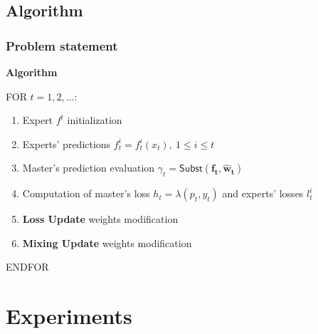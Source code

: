 \documentclass{beamer}
\begin{document}
\subsection{Algorithm} 
\begin{frame}
\frametitle{Problem statement}

\textbf{Algorithm}

\bigskip
%
FOR $t = 1, 2, \dots$:
\begin{enumerate}
\item Expert $f^t$ initialization
\item Experts' predictions $f_t^i = f_t^i(x_t),\ 1 \le i \le t$ 
\item Master's prediction evaluation $\gamma_t = \mathsf{Subst}(\mathbf{f_t}, \mathbf{\widehat{w}_t})$
\item Computation of master's loss $h_t = \lambda(p_t, y_t) $ and experts' losses $l_t^i$ 

\item \textbf{Loss Update} weights modification
\item \textbf{Mixing Update} weights modification

\end{enumerate}

ENDFOR

\end{frame}


\section{Experiments} 
\end{document}
